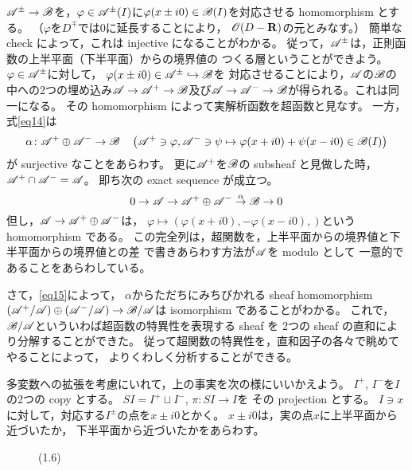 \(\mathscr{A}^{\pm}\to\mathscr{B}\)を，\(
    \varphi\in\mathscr{A}^{\pm}(I)
\)に\(
    \varphi(x\pm i0)\in\mathscr{B}(I)
\)を対応させる homomorphism とする。
（\(\varphi\)を\(D^{\mp}\)では0に延長することにより，
\(\mathscr{O}(D-\mathbf{R})\)の元とみなす。）
簡単な check によって，これは injective になることがわかる。
従って，\(\mathscr{A}^{\pm}\)は，正則函数の上半平面（下半平面）からの境界値の
つくる層ということができよう。
\(\varphi\in\mathscr{A}^{\pm}\)に対して，
\(\varphi(x\pm i0)\in\mathscr{A}^{\pm}\hookrightarrow\mathscr{B}\)を
対応させることにより，\(\mathscr{A}\)の\(\mathscr{B}\)の中への2つの埋め込み\(
    \mathscr{A}\to\mathscr{A}^{+}\to\mathscr{B}
\)及び\(
    \mathscr{A}\to\mathscr{A}^{-}\to\mathscr{B}
\)が得られる。これは同一になる。
その homomorphism によって実解析函数を超函数と見なす。
一方，式\eqref{eq14}は
\[
    \alpha\colon
    \mathscr{A}^{+}\oplus\mathscr{A}^{-}\to\mathscr{B}
    \quad
    \left(\mathscr{A}^{+}\ni\varphi,\mathscr{A}^{-}\ni\psi
    \mapsto
    \varphi(x+i0)+\psi(x-i0)
    \in\mathscr{B}(I)\right)
\]
が surjective なことをあらわす。
更に\(\mathscr{A}^{+}\)を\(\mathscr{B}\)の subsheaf と見做した時，
\(\mathscr{A}^{+}\cap\mathscr{A}^{-}=\mathscr{A}\)。
即ち次の exact sequence が成立つ。
\begin{equation}
    0\to\mathscr{A}
    \to\mathscr{A}^{+}\oplus\mathscr{A}^{-}
    \overset{\alpha}{\to}\mathscr{B}\to0\label{eq15}
\end{equation}
但し，\(\mathscr{A}\to\mathscr{A}^{+}\oplus\mathscr{A}^{-}\)は，
\(
    \varphi\mapsto
    \left(
        \varphi(x+i0),
        -\varphi(x-i0),
    \right)
\)という homomorphism である。
この完全列は，超関数を，上半平面からの境界値と下半平面からの境界値との差
で書きあらわす方法が\(\mathscr{A}\)を modulo として
一意的であることをあらわしている。

さて，\eqref{eq15}によって，
\(\alpha\)からただちにみちびかれる sheaf homomorphism \(
    \left(\mathscr{A}^{+}/\mathscr{A}\right)\oplus
    \left(\mathscr{A}^{-}/\mathscr{A}\right)
    \to\mathscr{B}/\mathscr{A}
\)は isomorphism であることがわかる。
これで，\(\mathscr{B}/\mathscr{A}\)といういわば超函数の特異性を表現する sheaf を
2つの sheaf の直和により分解することができた。
従って超関数の特異性を，直和因子の各々で眺めてやることによって，
よりくわしく分析することができる。

多変数への拡張を考慮にいれて，上の事実を次の様にいいかえよう。
\(I^{+}\), \(I^{-}\)を\(I\)の2つの copy とする。
\(SI=I^{+}\sqcup I^{-}\), \(\pi\colon SI\to I\)を
その projection とする。
\(I\ni x\)に対して，対応する\(I^{\pm}\)の点を\(x\pm i0\)とかく。
\(x\pm i0\)は，実の点\(x\)に上半平面から近づいたか，
下半平面から近づいたかをあらわす。

\begin{figure}[htb]
    \centering
    \caption{(1.6)}
    \label{fig:16}
\end{figure}

